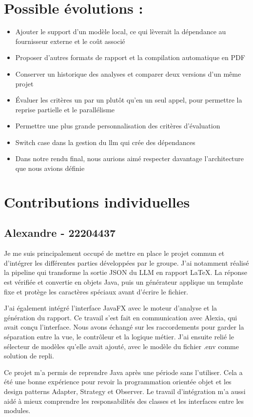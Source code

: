 \documentclass[11pt,a4paper]{article}
\begin{document}
\section{Possible évolutions :}
\begin{itemize}
    \item Ajouter le support d'un modèle local, ce qui lèverait la dépendance au fournisseur externe et le coût associé
    \item Proposer d'autres formats de rapport et la compilation automatique en PDF
    \item Conserver un historique des analyses et comparer deux versions d'un même projet
    \item Évaluer les critères un par un plutôt qu'en un seul appel, pour permettre la reprise partielle et le parallélisme
    \item Permettre une plus grande personnalisation des critères d’évaluation
    \item Switch case dans la gestion du llm qui crée des dépendances
    \item Dans notre rendu final, nous aurions aimé respecter davantage l’architecture que nous avions définie
\end{itemize}

\clearpage
\section{Contributions individuelles}
\subsection*{Alexandre - 22204437}
Je me suis principalement occupé de mettre en place le projet commun et d’intégrer les différentes parties développées par le groupe. J’ai notamment réalisé la pipeline qui transforme la sortie JSON du LLM en rapport LaTeX. La réponse est vérifiée et convertie en objets Java, puis un générateur applique un template fixe et protège les caractères spéciaux avant d’écrire le fichier.

J’ai également intégré l’interface JavaFX avec le moteur d’analyse et la génération du rapport. Ce travail s’est fait en communication avec Alexia, qui avait conçu l’interface. Nous avons échangé sur les raccordements pour garder la séparation entre la vue, le contrôleur et la logique métier. J’ai ensuite relié le sélecteur de modèles qu’elle avait ajouté, avec le modèle du fichier .env comme solution de repli.

Ce projet m’a permis de reprendre Java après une période sans l’utiliser. Cela a été une bonne expérience pour revoir la programmation orientée objet et les design patterns Adapter, Strategy et Observer. Le travail d’intégration m’a aussi aidé à mieux comprendre les responsabilités des classes et les interfaces entre les modules.
\end{document}
